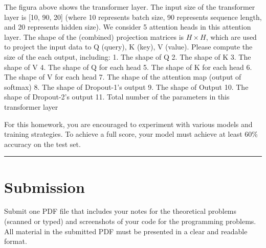 \documentclass[
  letterpaper,
  DIV=11,
  numbers=noendperiod]{scrartcl}
\begin{document}
The figura above shows the transformer layer. The input size of the
transformer layer is {[}10, 90, 20{]} (where 10 represents batch size,
90 represents sequence length, and 20 represents hidden size). We
consider 5 attention heads in this attention layer. The shape of the
(combined) projection matrices is \(H\times H\), which are used to
project the input data to Q (query), K (key), V (value). Please compute
the size of the each output, including: 1. The shape of Q 2. The shape
of K 3. The shape of V 4. The shape of Q for each head 5. The shape of K
for each head 6. The shape of V for each head 7. The shape of the
attention map (output of softmax) 8. The shape of Dropout-1's output 9.
The shape of Output 10. The shape of Dropout-2's output 11. Total number
of the parameters in this transformer layer

For this homework, you are encouraged to experiment with various models
and training strategies. To achieve a full score, your model must
achieve at least 60\% accuracy on the test set.

\begin{center}\rule{0.5\linewidth}{0.5pt}\end{center}

\section{Submission}\label{submission}

Submit one PDF file that includes your notes for the theoretical
problems (scanned or typed) and screenshots of your code for the
programming problems. All material in the submitted PDF must be
presented in a clear and readable format.
\end{document}
